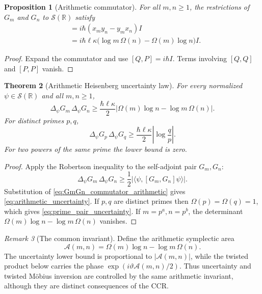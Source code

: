 \documentclass[11pt]{amsart}
\numberwithin{equation}{section}
\theoremstyle{plain}
\newtheorem{theorem}{Theorem}[section]
\newtheorem{proposition}[theorem]{Proposition}
\theoremstyle{definition}
\theoremstyle{remark}
\newtheorem{remark}[theorem]{Remark}
\newcommand{\R}{\mathbb{R}}
\newcommand{\Sch}{\mathcal{S}}
\begin{document}
\begin{proposition}[Arithmetic commutator]
\label{prop:arithmetic_generator_commutator}
For all \(m,n\ge1\), the restrictions of \(G_m\) and \(G_n\) to \(\Sch(\R)\) satisfy
\begin{align}
[G_m,G_n]
&=i\hbar(x_my_n-y_mx_n)I
\label{eq:GmGn_commutator_xy}\\
&=i\hbar\ell\kappa
\bigl(\log m\,\Omega(n)-\Omega(m)\log n\bigr)I.
\label{eq:GmGn_commutator_arithmetic}
\end{align}
\end{proposition}

\begin{proof}
Expand the commutator and use \([Q,P]=i\hbar I\).  Terms involving
\([Q,Q]\) and \([P,P]\) vanish.
\end{proof}

\begin{theorem}[Arithmetic Heisenberg uncertainty law]
\label{thm:arithmetic_uncertainty}
For every normalized \(\psi\in\Sch(\R)\) and all \(m,n\ge1\),
\begin{equation}
\boxed{
\Delta_\psi G_m\,\Delta_\psi G_n
\ge
\frac{\hbar\ell\kappa}{2}
\left|\Omega(m)\log n-\log m\,\Omega(n)\right|.}
\label{eq:arithmetic_uncertainty}
\end{equation}
For distinct primes \(p,q\),
\begin{equation}
\boxed{
\Delta_\psi G_p\,\Delta_\psi G_q
\ge
\frac{\hbar\ell\kappa}{2}
\left|\log\frac{q}{p}\right|.}
\label{eq:prime_pair_uncertainty}
\end{equation}
For two powers of the same prime the lower bound is zero.
\end{theorem}

\begin{proof}
Apply the Robertson inequality to the self-adjoint pair \(G_m,G_n\):
\begin{equation}
\Delta_\psi G_m\,\Delta_\psi G_n
\ge
\frac12
\left|\langle\psi,[G_m,G_n]\psi\rangle\right|.
\label{eq:Robertson_GmGn}
\end{equation}
Substitution of \eqref{eq:GmGn_commutator_arithmetic} gives
\eqref{eq:arithmetic_uncertainty}.  If \(p,q\) are distinct primes then
\(\Omega(p)=\Omega(q)=1\), which gives \eqref{eq:prime_pair_uncertainty}.
If \(m=p^a,n=p^b\), the determinant
\(\Omega(m)\log n-\log m\,\Omega(n)\) vanishes.
\end{proof}

\begin{remark}[The common invariant]
\label{rem:common_symplectic_invariant}
Define the arithmetic symplectic area
\begin{equation}
\mathcal A(m,n)
=
\Omega(m)\log n-\log m\,\Omega(n).
\label{eq:arithmetic_symplectic_area}
\end{equation}
The uncertainty lower bound is proportional to \( |\mathcal A(m,n)| \),
while the twisted product below carries the phase
\(\exp(i\vartheta\mathcal A(m,n)/2)\).  Thus uncertainty and twisted
M\"obius inversion are controlled by the same arithmetic invariant, although
they are distinct consequences of the CCR.
\end{remark}
\end{document}
